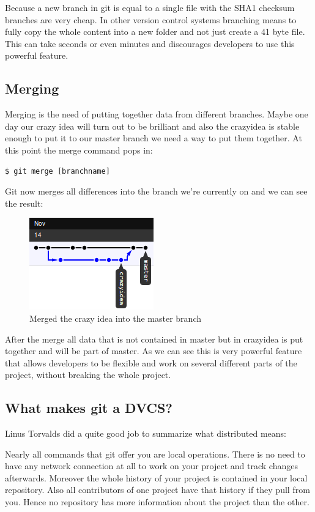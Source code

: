 Because a new branch in git is equal to a single
file with the SHA1 checksum branches are very cheap. In other version control systems branching means to
fully copy the whole content into a new folder and not just create a 41 byte
file. This can take seconds or even minutes and discourages developers to use
this powerful feature. \cite[Chapter 3.1]{gitpro2009}

\subsection {Merging}

Merging is the need of putting together data from different branches. Maybe one
day our crazy idea will turn out to be brilliant and also the crazyidea is
stable enough to put it to our master branch we need a way to put them together.
At this point the merge command pops in:

\begin{lstlisting}
$ git merge [branchname]
\end{lstlisting}

Git now merges all differences into the branch we're currently on and we can see
the result:
\begin{figure}[h]
  \centering 
  \includegraphics{img/merge1}
  \caption{Merged the crazy idea into the master branch}
  \label{}
\end{figure}

After the merge all data that is not contained in master but in crazyidea is put
together and will be part of master. As we can see this is very powerful feature
that allows developers to be flexible and work on several different parts of the
project, without breaking the whole project. \cite[Page 30-31]{gitinternals2008}

\subsection {What makes git a DVCS?}

Linus Torvalds did a quite good job to summarize what distributed means:

 \cite{googletechtalk2007}

Nearly all commands that git offer you are local operations. There is no need to
have any network connection at all to work on your project and track changes
afterwards. Moreover the whole history of your project is contained in your
local repository. Also all contributors of one project have that history if
they pull from you. Hence no repository has more information about the project
than the other.

